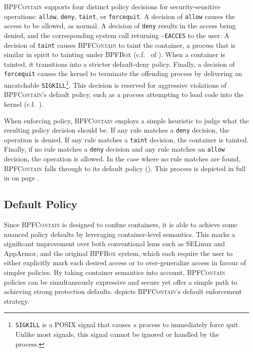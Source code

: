 \documentclass[
  fontsize=12pt,
  titlepage=firstiscover,
  paper=letter,
oneside,
  cleardoublepage=plain,
  parskip=half-,
  DIV=10,
  parindent,
  appendixprefix,
  chapterprefix,
  listof=totoc,
]{scrbook}
\newcommand{\bpfbox}{\textsc{BPFBox}}
\newcommand{\bpfcontain}{\textsc{BPFContain}}
\begin{document}
\bpfcontain{} supports four distinct policy decisions for security-sensitive operations:
\texttt{allow}, \texttt{deny}, \texttt{taint}, or \texttt{forcequit}. A decision of
\texttt{allow} causes the access to be allowed, as normal. A decision of \texttt{deny}
results in the access being denied, and the corresponding system call returning
\texttt{-EACCES} to the user. A decision of \texttt{taint} causes \bpfcontain{} to taint
the container, a process that is similar in spirit to tainting under \bpfbox{}
(c.f.\  of ). When a container is tainted, it
transitions into a stricter default-deny policy. Finally, a decision of \texttt{forcequit}
causes the kernel to terminate the offending process by delivering an uncatchable
\texttt{SIGKILL}\footnote{\texttt{SIGKILL} is a POSIX signal that causes a process to
immediately force quit. Unlike most signals, this signal cannot be ignored or handled by
the process.}. This decision is reserved for aggressive violations of \bpfcontain{}'s
default policy, such as a process attempting to load code into the kernel
(c.f.\ ).

When enforcing policy, \bpfcontain{} employs a simple heuristic to judge what the
resulting policy decision should be. If any rule matches a \texttt{deny} decision, the
operation is denied. If any rule matches a \texttt{taint} decision, the container is
tainted.  Finally, if no rule matches a \texttt{deny} decision and any rule matches an
\texttt{allow} decision, the operation is allowed. In the case where no rule matches are
found, \bpfcontain{} falls through to its default policy ().
This process is depicted in full in  on page
\pageref{fig:bpfcontain-enforcement}.

\subsection{Default Policy}\label{ss:bpfcontain-default}

Since \bpfcontain{} is designed to confine containers, it is able to achieve some nuanced
policy defaults by leveraging container-level semantics. This marks a significant
improvement over both conventional \glspl{lsm} such as SELinux and AppArmor, and the
original \bpfbox{} system, which each require the user to either explicitly mark each
desired access or to over-generalize access in favour of simpler policies. By taking
container semantics into account, \bpfcontain{} policies can be simultaneously expressive
and secure yet offer a simple path to achieving strong protection defaults.
 depicts \bpfcontain{}'s default enforcement strategy.
\end{document}
